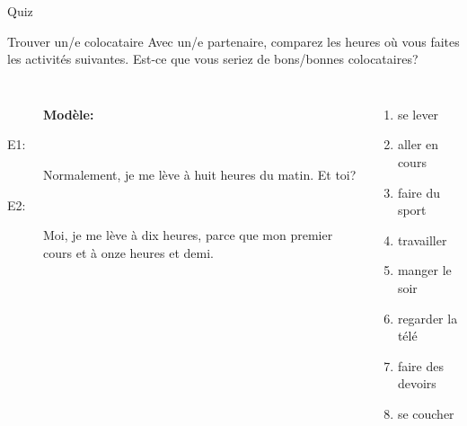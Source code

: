 \documentclass{beamer}
\begin{document}
  \begin{frame}{}
    \begin{center}
      \Large Quiz
    \end{center}
  \end{frame}

  \begin{frame}{Trouver un/e colocataire}
    Avec un/e partenaire, comparez les heures où vous faites les activités suivantes.
    Est-ce que vous seriez de bons/bonnes colocataires? \\
    \begin{columns}
        \begin{description}
          \item[] \textbf{Modèle:}
          \item[] 
          \item[E1:] Normalement, je me lève à huit heures du matin. Et toi?
          \item[E2:] Moi, je me lève à dix heures, parce que mon premier cours et à onze heures et demi.
        \end{description}
        \small
        \begin{enumerate}
          \item se lever
          \item aller en cours
          \item faire du sport
          \item travailler
          \item manger le soir
          \item regarder la télé
          \item faire des devoirs
          \item se coucher
        \end{enumerate}
    \end{columns}
  \end{frame}
\end{document}
